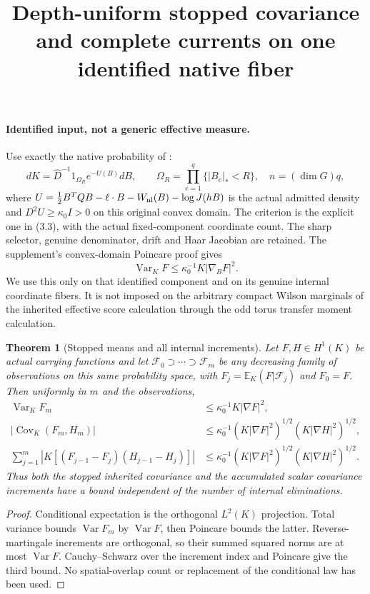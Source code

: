 \documentclass[11pt]{article}
\title{Depth-uniform stopped covariance and complete currents on one identified native fiber}\author{}\date{}
\newtheorem{theorem}{Theorem}
\newcommand{\E}{\mathbb E}
\newcommand{\Cov}{\operatorname{Cov}}
\newcommand{\Var}{\operatorname{Var}}
\begin{document}
\maketitle
\paragraph{Identified input, not a generic effective measure.}
Use exactly the native probability of \cite[Section~3]{ND}:
\[
 dK=\widehat D^{-1}1_{\Omega_R}e^{-U(B)}dB,\qquad
 \Omega_R=\prod_{e=1}^q\{|B_e|_*<R\},\quad n=(\dim G)q,
\]
where $U=\frac12B^TQB-\ell\cdot B-W_{\rm nl}(B)-\log J(hB)$ is the actual
admitted density and $D^2U\ge\kappa_0 I>0$ on this original convex domain.
The criterion is the explicit one in (3.3), with the actual fixed-component coordinate count.
The sharp selector, genuine denominator, drift and Haar Jacobian are retained.
The supplement's convex-domain Poincare proof gives
\[
 \Var_KF\le\kappa_0^{-1}K|\nabla_BF|^2.
\]
We use this only on that identified component and on its genuine internal coordinate fibers.
It is not imposed on the arbitrary compact Wilson marginals of the inherited effective score calculation through the odd torus transfer moment calculation.

\begin{theorem}[Stopped means and all internal increments]
Let $F,H\in H^1(K)$ be actual carrying functions and let
$\mathcal F_0\supset\cdots\supset\mathcal F_m$ be any decreasing family of observations
on this same probability space, with $F_j=\E_K(F|\mathcal F_j)$ and $F_0=F$.
Then uniformly in $m$ and the observations,
\begin{align}
 \Var_KF_m&\le\kappa_0^{-1}K|\nabla F|^2,\\
 |\Cov_K(F_m,H_m)|&\le\kappa_0^{-1}
       (K|\nabla F|^2)^{1/2}(K|\nabla H|^2)^{1/2},\\
 \sum_{j=1}^m\left|K[(F_{j-1}-F_j)(H_{j-1}-H_j)]\right|
 &\le\kappa_0^{-1}(K|\nabla F|^2)^{1/2}(K|\nabla H|^2)^{1/2}.
\end{align}
Thus both the stopped inherited covariance and the accumulated scalar covariance increments
have a bound independent of the number of internal eliminations.
\end{theorem}
\begin{proof}
Conditional expectation is the orthogonal $L^2(K)$ projection. Total variance bounds
$\Var F_m$ by $\Var F$, then Poincare bounds the latter. Reverse-martingale increments
are orthogonal, so their summed squared norms are at most $\Var F$.
Cauchy--Schwarz over the increment index and Poincare give the third bound.
No spatial-overlap count or replacement of the conditional law has been used.
\end{proof}
\end{document}
